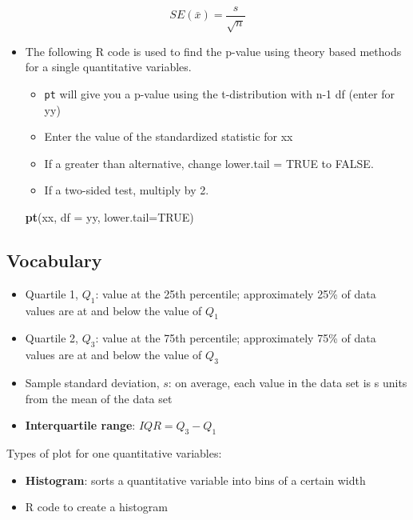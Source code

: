 \documentclass[
]{report}
\newenvironment{Shaded}{\begin{snugshade}}{\end{snugshade}}
\newcommand{\AttributeTok}[1]{\textcolor[rgb]{0.13,0.29,0.53}{#1}}
\newcommand{\ConstantTok}[1]{\textcolor[rgb]{0.56,0.35,0.01}{#1}}
\newcommand{\FunctionTok}[1]{\textcolor[rgb]{0.13,0.29,0.53}{\textbf{#1}}}
\newcommand{\NormalTok}[1]{#1}
\begin{document}
\[SE(\bar{x})=\frac{s}{\sqrt{n}}\]

\begin{itemize}
\item
  The following R code is used to find the p-value using theory based methods for a single quantitative variables.

  \begin{itemize}
  \item
    \texttt{pt} will give you a p-value using the t-distribution with n-1 df (enter for yy)
  \item
    Enter the value of the standardized statistic for xx
  \item
    If a greater than alternative, change lower.tail = TRUE to FALSE.
  \item
    If a two-sided test, multiply by 2.
  \end{itemize}

\begin{Shaded}
\begin{Highlighting}[]
\FunctionTok{pt}\NormalTok{(xx, }\AttributeTok{df =}\NormalTok{ yy, }\AttributeTok{lower.tail=}\ConstantTok{TRUE}\NormalTok{)}
\end{Highlighting}
\end{Shaded}
\end{itemize}

\subsection{Vocabulary}\label{vocabulary}

\begin{itemize}
\item
  Quartile 1, \(Q_1\): value at the 25th percentile; approximately 25\% of data values are at and below the value of \(Q_1\)
\item
  Quartile 2, \(Q_3\): value at the 75th percentile; approximately 75\% of data values are at and below the value of \(Q_3\)
\item
  Sample standard deviation, \(s\): on average, each value in the data set is s units from the mean of the data set
\item
  \textbf{Interquartile range}: \(IQR = Q_3-Q_1\)
\end{itemize}

Types of plot for one quantitative variables:

\begin{itemize}
\item
  \textbf{Histogram}: sorts a quantitative variable into bins of a certain width
\item
  R code to create a histogram
\end{itemize}
\end{document}
